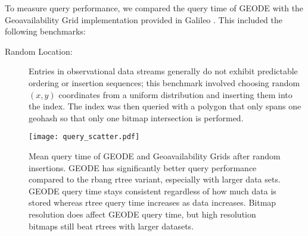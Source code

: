 To measure query performance, we compared the query time of GEODE with the Geoavailability Grid implementation provided in Galileo \cite{malensek2013polygon}. This included the following benchmarks:

\begin{description}
\item[Random Location:] Entries in observational data streams generally do not exhibit predictable ordering or insertion sequences; this benchmark involved choosing random $(x, y)$ coordinates from a uniform distribution and inserting them into the index. The index was then queried with a polygon that only spans one geohash so that only one bitmap intersection is performed.
\end{description}

\begin{figure}
    \centerline{\texttt{[image: query\_scatter.pdf]}}
    \caption{Mean query time of GEODE and Geoavailability Grids after random insertions. GEODE has significantly better query performance compared to the rbang rtree variant, especially with larger data sets. GEODE query time stays consistent regardless of how much data is stored whereas rtree query time increases as data increases. Bitmap resolution does affect GEODE query time, but high resolution bitmaps still beat rtrees with larger datasets.}
    \label{fig:mem}
\end{figure}
